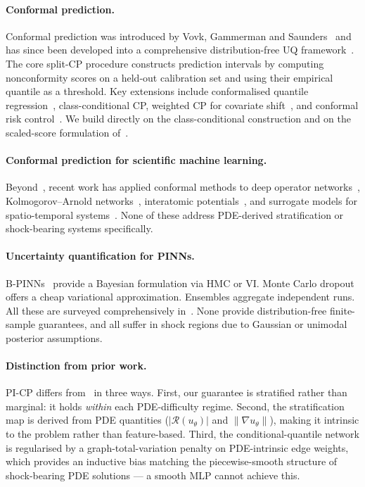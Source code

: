 \documentclass[11pt]{article}
\theoremstyle{definition}
\theoremstyle{remark}
\newcommand{\Rop}{\mathcal{R}}
\begin{document}
\paragraph{Conformal prediction.} Conformal prediction was introduced by Vovk, Gammerman and Saunders~\cite{vovk2005} and has since been developed into a comprehensive distribution-free UQ framework~\cite{angelopoulos2022gentle}. The core split-CP procedure constructs prediction intervals by computing nonconformity scores on a held-out calibration set and using their empirical quantile as a threshold. Key extensions include conformalised quantile regression~\cite{romano2019cqr}, class-conditional CP, weighted CP for covariate shift~\cite{tibshirani2019weighted}, and conformal risk control~\cite{angelopoulos2022crisk}. We build directly on the class-conditional construction and on the scaled-score formulation of~\cite{romano2019cqr}.

\paragraph{Conformal prediction for scientific machine learning.} Beyond~\cite{yu2025cp}, recent work has applied conformal methods to deep operator networks~\cite{moya2024deeponet}, Kolmogorov--Arnold networks~\cite{moya2025kan}, interatomic potentials~\cite{hu2022conformal}, and surrogate models for spatio-temporal systems~\cite{gopakumar2024surrogate}. None of these address PDE-derived stratification or shock-bearing systems specifically.

\paragraph{Uncertainty quantification for PINNs.} B-PINNs~\cite{yang2021bpinns} provide a Bayesian formulation via HMC or VI. Monte Carlo dropout~\cite{gal2016dropout} offers a cheap variational approximation. Ensembles aggregate independent runs. All these are surveyed comprehensively in~\cite{yu2025cp}. None provide distribution-free finite-sample guarantees, and all suffer in shock regions due to Gaussian or unimodal posterior assumptions.

\paragraph{Distinction from prior work.} PI-CP differs from~\cite{yu2025cp} in three ways. First, our guarantee is stratified rather than marginal: it holds \emph{within} each PDE-difficulty regime. Second, the stratification map is derived from PDE quantities ($|\Rop(u_\theta)|$ and $\|\nabla u_\theta\|$), making it intrinsic to the problem rather than feature-based. Third, the conditional-quantile network is regularised by a graph-total-variation penalty on PDE-intrinsic edge weights, which provides an inductive bias matching the piecewise-smooth structure of shock-bearing PDE solutions --- a smooth MLP cannot achieve this.
\end{document}
